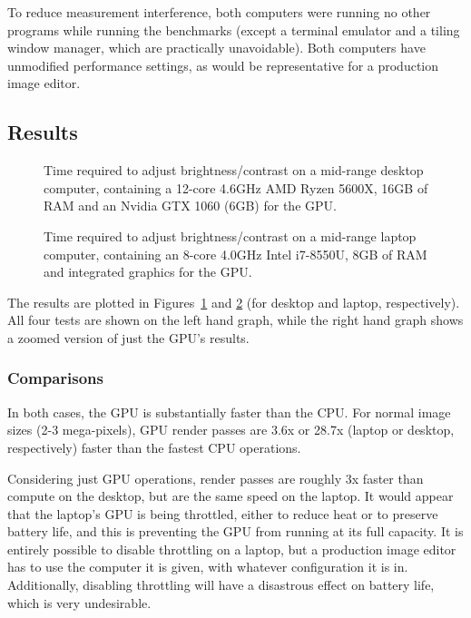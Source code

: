 \documentclass[12pt]{article}
\begin{document}
To reduce measurement interference, both computers were running no other programs while running the
benchmarks (except a terminal emulator and a tiling window manager, which are practically
unavoidable).  Both computers have unmodified performance settings, as would be representative for
a production image editor.

\subsection{Results}

\begin{figure}
    
    \caption{Time required to adjust brightness/contrast on a mid-range desktop computer, containing
    a 12-core 4.6GHz AMD Ryzen 5600X, 16GB of RAM and an Nvidia GTX 1060 (6GB) for the
    GPU.}\label{fig:pc-results}
\end{figure}

\begin{figure}
    
    \caption{Time required to adjust brightness/contrast on a mid-range laptop computer, containing
    an 8-core 4.0GHz Intel i7-8550U, 8GB of RAM and integrated graphics for the
    GPU.}\label{fig:laptop-results}
\end{figure}

The results are plotted in Figures~\ref{fig:pc-results} and \ref{fig:laptop-results} (for desktop
and laptop, respectively).  All four tests are shown on the left hand graph, while the right hand
graph shows a zoomed version of just the GPU's results.  

\subsubsection{Comparisons}

In both cases, the GPU is substantially faster than the CPU.  For normal image sizes (2-3
mega-pixels), GPU render passes are 3.6x or 28.7x (laptop or desktop, respectively) faster than the
fastest CPU operations.

Considering just GPU operations, render passes are roughly 3x faster than compute on the desktop,
but are the same speed on the laptop.  It would appear that the laptop's GPU is being throttled,
either to reduce heat or to preserve battery life, and this is preventing the GPU from running at
its full capacity.  It is entirely possible to disable throttling on a laptop, but a production
image editor has to use the computer it is given, with whatever configuration it is in.
Additionally, disabling throttling will have a disastrous effect on battery life, which is very
undesirable.
\end{document}
